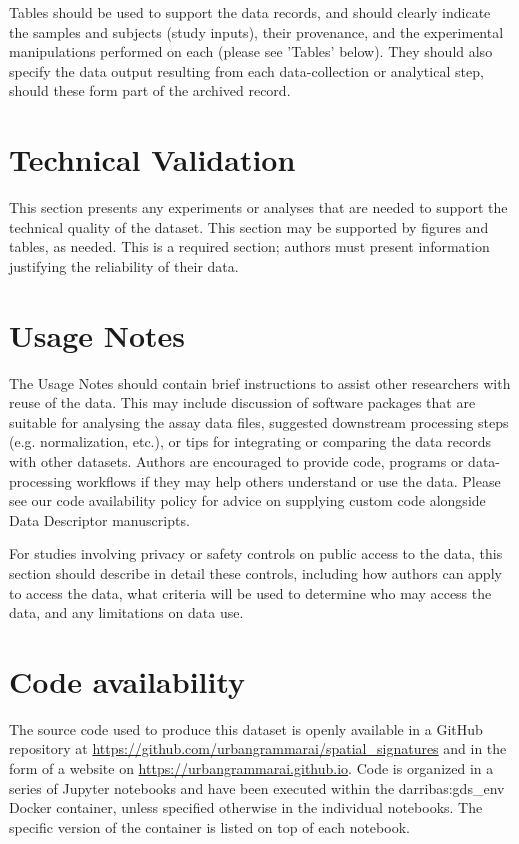 \documentclass[fleqn,10pt]{wlscirep}
\begin{document}
Tables should be used to support the data records, and should clearly indicate the
samples and subjects (study inputs), their provenance, and the experimental
manipulations performed on each (please see 'Tables' below). They should also specify
the data output resulting from each data-collection or analytical step, should these
form part of the archived record.



\section*{Technical Validation}

This section presents any experiments or analyses that are needed to support the
technical quality of the dataset. This section may be supported by figures and tables,
as needed. This is a required section; authors must present information justifying the
reliability of their data.




\section*{Usage Notes}

The Usage Notes should contain brief instructions to assist other researchers with reuse
of the data. This may include discussion of software packages that are suitable for
analysing the assay data files, suggested downstream processing steps (e.g.
normalization, etc.), or tips for integrating or comparing the data records with other
datasets. Authors are encouraged to provide code, programs or data-processing workflows
if they may help others understand or use the data. Please see our code availability
policy for advice on supplying custom code alongside Data Descriptor manuscripts.

For studies involving privacy or safety controls on public access to the data, this
section should describe in detail these controls, including how authors can apply to
access the data, what criteria will be used to determine who may access the data, and
any limitations on data use.



\section*{Code availability}

The source code used to produce this dataset is openly available in a GitHub repository
at
\hyperlink{https://github.com/urbangrammarai/spatial\_signatures}{https://github.com/urbangrammarai/spatial\_signatures}
and in the form of a website on
\hyperlink{https://urbangrammarai.github.io}{https://urbangrammarai.github.io}.
Code is
organized in a series of Jupyter notebooks and have been executed within the darribas:gds\_env
Docker container, unless specified otherwise in the individual notebooks. The specific version
of the container is listed on top of each notebook.
\end{document}
